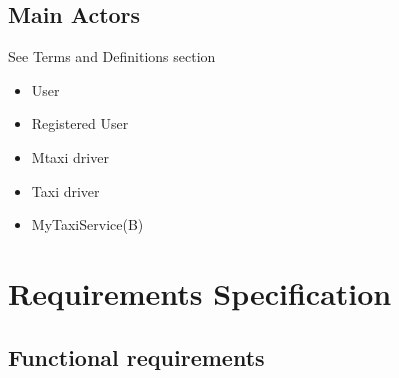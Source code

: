 \documentclass[11pt]{article} %
\begin{document}
      \subsection{Main Actors}
	See Terms and Definitions section
	\begin{itemize}
	        \item User
	        \item Registered User
	        \item Mtaxi driver
	        \item Taxi driver
	        \item MyTaxiService(B)
	\end{itemize}

\section{Requirements Specification}
    \subsection{Functional requirements}
\end{document}

